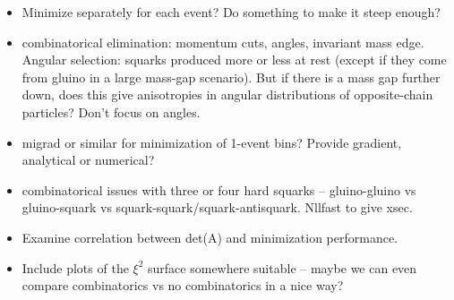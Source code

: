 \documentclass[twoside,english]{uiofysmaster}
\begin{document}
\begin{itemize}
	\item Minimize separately for each event? Do something to make it steep enough?
	\item combinatorical elimination: momentum cuts, angles, invariant mass edge. Angular selection: squarks produced more or less at rest (except if they come from gluino in a large mass-gap scenario). But if there is a mass gap further down, does this give anisotropies in angular distributions of opposite-chain particles? Don't focus on angles.
	\item migrad or similar for minimization of 1-event bins? Provide gradient, analytical or numerical?
	\item combinatorical issues with three or four hard squarks -- gluino-gluino vs gluino-squark vs squark-squark/squark-antisquark. Nllfast to give xsec. 
	\item Examine correlation between det(A) and minimization performance. 
	\item Include plots of the $\xi^2$ surface somewhere suitable -- maybe we can even compare combinatorics vs no combinatorics in a nice way?
\end{itemize}













































\end{document}

